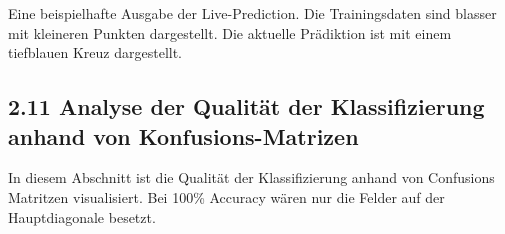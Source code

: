 \documentclass[11pt]{article}
\begin{document}
Eine beispielhafte Ausgabe der Live-Prediction. Die Trainingsdaten sind
blasser mit kleineren Punkten dargestellt. Die aktuelle Prädiktion ist
mit einem tiefblauen Kreuz dargestellt.

    \hypertarget{analyse-der-qualituxe4t-der-klassifizierung-anhand-von-konfusions-matrizen}{%
\subsection*{2.11 Analyse der Qualität der Klassifizierung anhand von
Konfusions-Matrizen}\label{analyse-der-qualituxe4t-der-klassifizierung-anhand-von-konfusions-matrizen}}

    In diesem Abschnitt ist die Qualität der Klassifizierung anhand von
Confusions Matritzen visualisiert. Bei 100\% Accuracy wären nur die
Felder auf der Hauptdiagonale besetzt.
\end{document}
